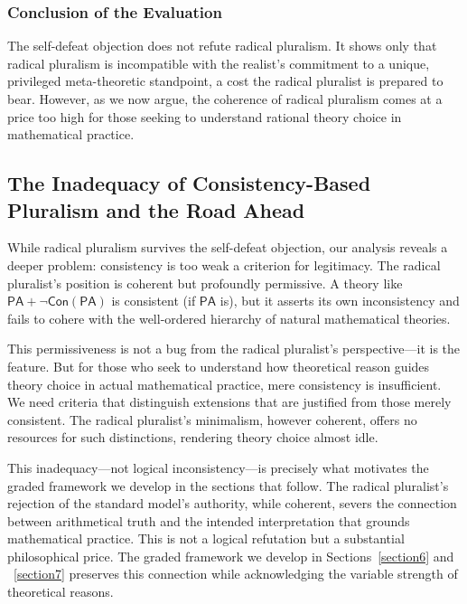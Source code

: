 \documentclass[a4paper,12pt]{amsart}
\theoremstyle{definition}
\numberwithin{equation}{section}
\begin{document}
\subsubsection{Conclusion of the Evaluation}

The self-defeat objection does not refute radical pluralism. It shows 
only that radical pluralism is incompatible with the realist's 
commitment to a unique, privileged meta-theoretic standpoint, a cost 
the radical pluralist is prepared to bear. However, as we now argue, 
the coherence of radical pluralism comes at a price too high for those 
seeking to understand rational theory choice in mathematical practice.

\subsection{The Inadequacy of Consistency-Based Pluralism and the Road Ahead}
 
While radical pluralism survives the self-defeat objection, our 
analysis reveals a deeper problem: consistency is too weak a criterion 
for legitimacy. The radical pluralist's position is coherent but 
profoundly permissive. A theory like $\mathsf{PA}+\neg\mathsf{Con}(\mathsf{PA})$ 
is consistent (if \(\mathsf{PA}\) is), but it asserts its own inconsistency and fails to cohere with the well-ordered hierarchy of natural mathematical theories.

This permissiveness is not a bug from the radical pluralist's perspective---it is the feature. But for those who seek to understand how theoretical reason guides theory choice in actual mathematical practice, mere consistency is insufficient. We need criteria that distinguish extensions that are justified from those merely consistent. The radical pluralist's minimalism, however coherent, offers no resources for such distinctions, rendering theory choice almost idle.
   
This inadequacy---not logical inconsistency---is precisely what motivates the graded framework we develop in the sections that follow. The radical pluralist's rejection of the standard model's authority, while coherent, severs the connection between arithmetical truth and the intended interpretation that grounds mathematical practice. This is not a logical refutation but a substantial philosophical price. The graded framework we develop in Sections~\ref{section6} and ~\ref{section7} preserves this connection while acknowledging the variable strength of theoretical reasons.
  
\end{document}
